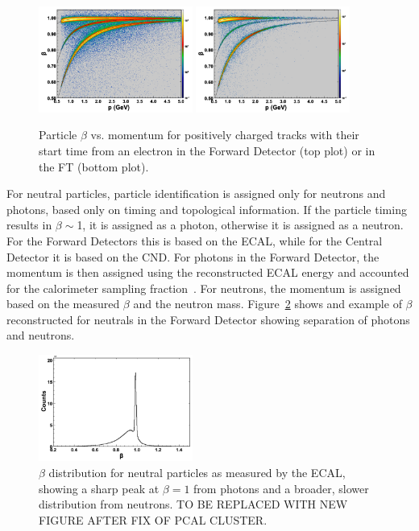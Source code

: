 \vfil

\begin{figure}[t]
\centering
\includegraphics[width=0.45\textwidth]{pics/ftof_betap.png}
\includegraphics[width=0.45\textwidth]{pics/ft_betap.png}
\caption{Particle $\beta$ vs. momentum for positively charged tracks with their start time from an electron in
the Forward Detector (top plot) or in the FT (bottom plot).}
\label{fig:betavsp}
\end{figure}

For neutral particles, particle identification is assigned only for neutrons and photons, based only on timing and
topological information. If the particle timing results in $\beta\sim$1, it is assigned as a photon, otherwise it
is assigned as a neutron. For the Forward Detectors this is based on the ECAL, while for the Central Detector it
is based on the CND. For photons in the Forward Detector, the momentum is then assigned using the reconstructed
ECAL energy and accounted for the calorimeter sampling fraction~\cite{ecal-nim}.  For neutrons, the momentum is
assigned based on the measured $\beta$ and the neutron mass. Figure~\ref{fig:neutbeta} shows and example
of $\beta$ reconstructed for neutrals in the Forward Detector showing separation of photons and neutrons.

\begin{figure}
\centering
\includegraphics[width=0.45\textwidth]{pics/neutral_beta.png}
\caption{$\beta$ distribution for neutral particles as measured by the ECAL, showing a sharp peak at $\beta=1$
  from photons and a broader, slower distribution from neutrons. TO BE REPLACED WITH NEW FIGURE AFTER
  FIX OF PCAL CLUSTER.}
\label{fig:neutbeta}
\end{figure}

